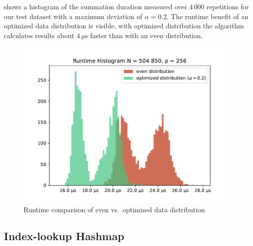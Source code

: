  shows a histogram of the summation duration measured over $4\,000$ repetitions for our test dataset with a maximum deviation of $\alpha = 0.2$.
The runtime benefit of an optimized data distribution is visible, with optimized distribution the algorithm calculates results about $\SI{4}{\micro\second}$ faster than with  an even distribution.

\begin{figure}
\centering
\includegraphics[scale=0.75]{figures/distribution_experiment}
\caption{Runtime comparison of even vs.\ optimized data distribution}
\label{fig:distribution_runtimes}
\end{figure}


\subsection{Index-lookup Hashmap}
\label{sec:IndexLookupHashmap}

